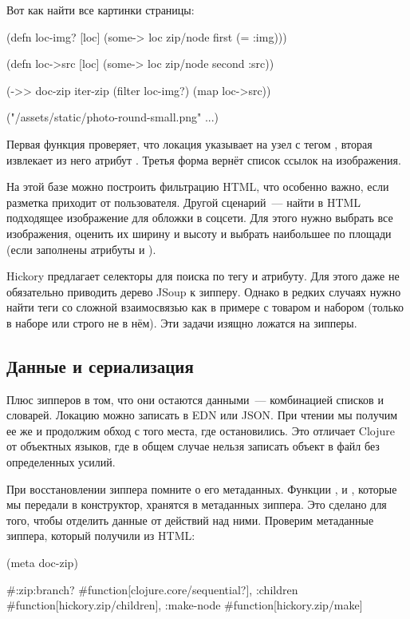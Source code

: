 Вот как найти все картинки страницы:

\begin{english}
  \begin{clojure}
(defn loc-img? [loc]
  (some-> loc zip/node first (= :img)))

(defn loc->src [loc]
  (some-> loc zip/node second :src))

(->> doc-zip
     iter-zip
     (filter loc-img?)
     (map loc->src))

("/assets/static/photo-round-small.png" ...)
  \end{clojure}
\end{english}

Первая функция проверяет, что локация указывает на узел с тегом , вторая
извлекает из него атрибут . Третья форма вернёт список ссылок на
изображения.

На этой базе можно построить фильтрацию HTML, что особенно важно, если разметка
приходит от пользователя. Другой сценарий~--- найти в HTML подходящее изображение
для обложки в соцсети. Для этого нужно выбрать все изображения, оценить их
ширину и высоту и выбрать наибольшее по площади (если заполнены атрибуты 
и ).

Hickory предлагает селекторы для поиска по тегу и атрибуту. Для этого даже не
обязательно приводить дерево JSoup к зипперу. Однако в редких случаях нужно
найти теги со сложной взаимосвязью как в примере с товаром и набором (только в
наборе или строго не в нём). Эти задачи изящно ложатся на зипперы.

\subsection{Данные и сериализация}

Плюс зипперов в том, что они остаются данными~--- комбинацией списков и
словарей. Локацию можно записать в EDN или JSON. При чтении мы получим ее же и
продолжим обход с того места, где остановились. Это отличает Clojure от
объектных языков, где в общем случае нельзя записать объект в файл без
определенных усилий.

При восстановлении зиппера помните о его метаданных. Функции ,
 и , которые мы передали в конструктор, хранятся в
метаданных зиппера. Это сделано для того, чтобы отделить данные от действий над
ними. Проверим метаданные зиппера, который получили из HTML:

\begin{english}
  \begin{clojure}
(meta doc-zip)

#:zip{:branch? #function[clojure.core/sequential?],
      :children #function[hickory.zip/children],
      :make-node #function[hickory.zip/make]}
  \end{clojure}
\end{english}

